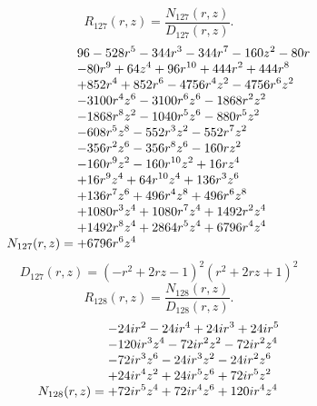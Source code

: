 \documentclass[11pt,a4paper]{article}
\begin{document}
\begin{equation}
R_{127}(r,z)=\frac{N_{127}(r,z)}{D_{127}(r,z)}.
\label{eq:cat-rational-127}
\end{equation}
\begin{equation}
N_{127}(r,z)=\shortstack[l]{$\displaystyle 96 - 528 r^{5} - 344 r^{3} - 344 r^{7} - 160 z^{2} - 80 r$\\
$\displaystyle  - 80 r^{9} + 64 z^{4} + 96 r^{10} + 444 r^{2} + 444 r^{8}$\\
$\displaystyle  + 852 r^{4} + 852 r^{6} - 4756 r^{4} z^{2} - 4756 r^{6} z^{2}$\\
$\displaystyle  - 3100 r^{4} z^{6} - 3100 r^{6} z^{6} - 1868 r^{2} z^{2}$\\
$\displaystyle  - 1868 r^{8} z^{2} - 1040 r^{5} z^{6} - 880 r^{5} z^{2}$\\
$\displaystyle  - 608 r^{5} z^{8} - 552 r^{3} z^{2} - 552 r^{7} z^{2}$\\
$\displaystyle  - 356 r^{2} z^{6} - 356 r^{8} z^{6} - 160 r z^{2}$\\
$\displaystyle  - 160 r^{9} z^{2} - 160 r^{10} z^{2} + 16 r z^{4}$\\
$\displaystyle  + 16 r^{9} z^{4} + 64 r^{10} z^{4} + 136 r^{3} z^{6}$\\
$\displaystyle  + 136 r^{7} z^{6} + 496 r^{4} z^{8} + 496 r^{6} z^{8}$\\
$\displaystyle  + 1080 r^{3} z^{4} + 1080 r^{7} z^{4} + 1492 r^{2} z^{4}$\\
$\displaystyle  + 1492 r^{8} z^{4} + 2864 r^{5} z^{4} + 6796 r^{4} z^{4}$\\
$\displaystyle  + 6796 r^{6} z^{4}$}
\label{eq:cat-numerator-127}
\end{equation}
\begin{equation}
D_{127}(r,z)=\left(- r^{2} + 2 r z - 1\right)^{2} \left(r^{2} + 2 r z + 1\right)^{2}
\label{eq:cat-denominator-127}
\end{equation}
\begin{equation}
R_{128}(r,z)=\frac{N_{128}(r,z)}{D_{128}(r,z)}.
\label{eq:cat-rational-128}
\end{equation}
\begin{equation}
N_{128}(r,z)=\shortstack[l]{$\displaystyle  - 24 i r^{2} - 24 i r^{4} + 24 i r^{3} + 24 i r^{5}$\\
$\displaystyle  - 120 i r^{3} z^{4} - 72 i r^{2} z^{2} - 72 i r^{2} z^{4}$\\
$\displaystyle  - 72 i r^{3} z^{6} - 24 i r^{3} z^{2} - 24 i r^{2} z^{6}$\\
$\displaystyle  + 24 i r^{4} z^{2} + 24 i r^{5} z^{6} + 72 i r^{5} z^{2}$\\
$\displaystyle  + 72 i r^{5} z^{4} + 72 i r^{4} z^{6} + 120 i r^{4} z^{4}$}
\label{eq:cat-numerator-128}
\end{equation}
\end{document}

